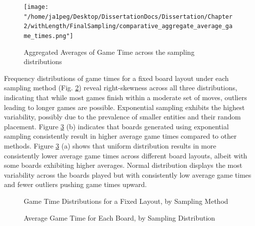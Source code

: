 \begin{figure}[ht]
	\centering
	\texttt{[image: "/home/ja1peg/Desktop/DissertationDocs/Dissertation/Chapter 2/withLength/FinalSampling/comparative\_aggregate\_average\_game\_times.png"]} 
	\caption{Aggregated Averages of Game Time across the sampling distributions}
	\label{fig:sampling_dist_avg_times}
\end{figure}

Frequency distributions of game times for a fixed board layout under each sampling method (Fig. \ref{fig:sampling_dist_layout_dists}) reveal right-skewness across all three distributions, indicating that while most games finish within a moderate set of moves, outliers leading to longer games are possible. Exponential sampling exhibits the highest variability, possibly due to the prevalence of smaller entities and their random placement. Figure \ref{fig:sampling_dist_board_avg_times} (b) indicates that boards generated using exponential sampling consistently result in higher average game times compared to other methods. Figure \ref{fig:sampling_dist_board_avg_times} (a) shows that uniform distribution results in more consistently lower average game times across different board layouts, albeit with some boards exhibiting higher averages. Normal distribution displays the most variability across the boards played but with consistently low average game times and fewer outliers pushing game times upward.

\begin{figure}[ht]
	\centering
	\caption{Game Time Distributions for a Fixed Layout, by Sampling Method}
	\label{fig:sampling_dist_layout_dists}
\end{figure}

\begin{figure}[ht]
	\centering
	\linebreak
	\caption{Average Game Time for Each Board, by Sampling Distribution}
	\label{fig:sampling_dist_board_avg_times}
\end{figure}


